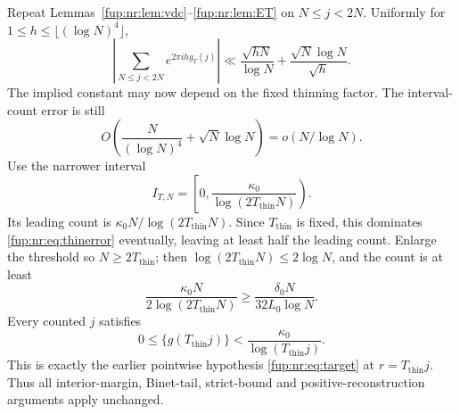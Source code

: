 \documentclass[11pt,letterpaper]{article}
\theoremstyle{definition}\newtheorem{definition}[theorem]{Definition}
\theoremstyle{remark}\newtheorem{remark}[theorem]{Remark}
\begin{document}
Repeat Lemmas~\ref{fup:nr:lem:vdc}--\ref{fup:nr:lem:ET} on $N\le j<2N$. Uniformly for $1\le h\le\lfloor(\log N)^4\rfloor$,
\[
 \left|\sum_{N\le j<2N}e^{2\pi ihg_T(j)}\right|
 \ll\frac{\sqrt{hN}}{\log N}+\frac{\sqrt N\log N}{\sqrt h}.
\]
The implied constant may now depend on the fixed thinning factor. The interval-count error is still
\begin{equation}\label{fup:nr:eq:thinerror}
 O\!\left(\frac N{(\log N)^4}+\sqrt N\log N\right)=o(N/\log N).
\end{equation}
Use the narrower interval
\[
 I_{T,N}=\left[0,\frac{\kappa_0}{\log(2T_{\mathrm{thin}}N)}\right).
\]
Its leading count is $\kappa_0N/\log(2T_{\mathrm{thin}}N)$. Since $T_{\mathrm{thin}}$ is fixed, this dominates \eqref{fup:nr:eq:thinerror} eventually, leaving at least half the leading count. Enlarge the threshold so $N\ge2T_{\mathrm{thin}}$; then $\log(2T_{\mathrm{thin}}N)\le2\log N$, and the count is at least
\begin{equation}\label{fup:nr:eq:thincount}
 \frac{\kappa_0N}{2\log(2T_{\mathrm{thin}}N)}
 \ge\frac{\delta_0N}{32L_0\log N}.
\end{equation}
Every counted $j$ satisfies
\[
 0\le\{g(T_{\mathrm{thin}}j)\}
 <\frac{\kappa_0}{\log(T_{\mathrm{thin}}j)}.
\]
This is exactly the earlier pointwise hypothesis \eqref{fup:nr:eq:target} at $r=T_{\mathrm{thin}}j$. Thus all interior-margin, Binet-tail, strict-bound and positive-reconstruction arguments apply unchanged.
\end{document}
